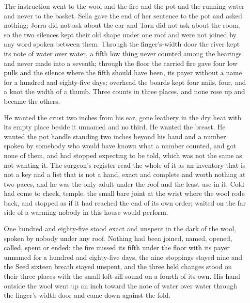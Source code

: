 The instruction went to the wool and the fire and the pot and the running water and never to the basket. Sella gave the end of her sentence to the pot and asked nothing; Jorra did not ask about the ear and Tarn did not ask about the room, so the two silences kept their old shape under one roof and were not joined by any word spoken between them. Through the finger's-width door the river kept its note of water over water, a fifth low thing never counted among the hearings and never made into a seventh; through the floor the carried fire gave four low pulls and the silence where the fifth should have been, its payer without a name for a hundred and eighty-five days; overhead the boards kept four nails, four, and a knot the width of a thumb. Three counts in three places, and none rose up and became the others.

He wanted the crust two inches from his ear, gone leathery in the dry heat with its empty place beside it unnamed and no third. He wanted the breast. He wanted the pot handle standing two inches beyond his hand and a number spoken by somebody who would have known what a number counted, and got none of them, and had stopped expecting to be told, which was not the same as not wanting it. The surgeon's register read the whole of it as an inventory that is not a key and a list that is not a hand, exact and complete and worth nothing at two paces, and he was the only adult under the roof and the least use in it. Cold had come to cheek, temple, the small bare joint at the wrist where the wool rode back, and stopped as if it had reached the end of its own order;  waited on the far side of a warming nobody in this house would perform.

One hundred and eighty-five stood exact and unspent in the dark of the wool, spoken by nobody under any roof. Nothing had been joined, named, opened, called, spent or ended; the fire missed its fifth under the floor with its payer unnamed for a hundred and eighty-five days, the nine stoppings stayed nine and the Seed sixteen breath stayed unspent, and the three held changes stood on their three places with the small loft-sill sound on a fourth of its own. His hand outside the wool went up an inch toward the note of water over water through the finger's-width door and came down against the fold.
